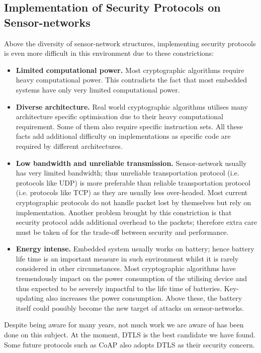 \subsection{Implementation of Security Protocols on Sensor-networks}
Above the diversity of sensor-network structures, implementing security protocols is even more difficult in this environment due to these constrictions:
\begin{itemize}
\item {\bf Limited computational power.} Most cryptographic algorithms require heavy computational power. This contradicts the fact that most embedded systems have only very limited computational power.

\item {\bf Diverse architecture.} Real world cryptographic algorithms utilises many architecture specific optimisation due to their heavy computational requirement. Some of them also require specific instruction sets. All these facts add additional difficulty on implementations as specific code are required by different architectures.

\item {\bf Low bandwidth and unreliable transmission.} Sensor-network usually has very limited bandwidth; thus unreliable transportation protocol (i.e. protocols like UDP) is more preferable than reliable transportation protocol (i.e. protocols like TCP) as they are usually less over-headed. Most current cryptographic protocols do not handle packet lost by themselves but rely on implementation. Another problem brought by this constriction is that security protocol adds additional overhead to the packets; therefore extra care must be taken of for the trade-off between security and performance.

\item {\bf Energy intense.} Embedded system usually works on battery; hence battery life time is an important measure in such environment whilst it is rarely considered in other circumstances. Most cryptographic algorithms have tremendously impact on  the power consumption of the utilising device and thus expected to be severely impactful to the life time of batteries. Key-updating also increases the power consumption. Above these, the battery itself could possibly become the new target of attacks on sensor-networks.
\end{itemize}

Despite being aware for many years, not much work we are aware of has been done on this subject. At the moment, DTLS\cite{DTLS} is the best candidate we have found. Some future protocols such as CoAP\cite{CoAP} also adopts DTLS as their security concern.

